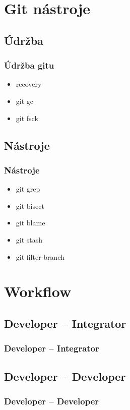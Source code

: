 \documentclass[pdftex]{beamer}
\begin{document}
\section{Git nástroje}

\subsection{Údržba}

\begin{frame}
	\frametitle{Údržba gitu}
	\begin{itemize}
		\item recovery
		\item git gc
		\item git fsck
	\end{itemize}
\end{frame}

\subsection{Nástroje}

\begin{frame}
	\frametitle{Nástroje}
	\begin{itemize}
		\item git grep
		\item git bisect
		\item git blame
		\item git stash
		\item git filter-branch
	\end{itemize}
\end{frame}

\section{Workflow}

\subsection{Developer -- Integrator}

\begin{frame}
	\frametitle{Developer -- Integrator}
\end{frame}

\subsection{Developer -- Developer}

\begin{frame}
	\frametitle{Developer -- Developer}
\end{frame}
\end{document}
